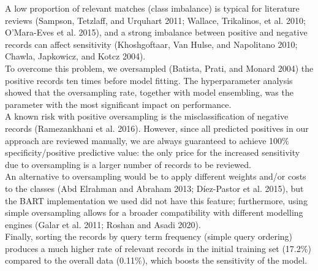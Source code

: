 \documentclass{article}
\begin{document}
A low proportion of relevant matches (class imbalance) is typical for
literature reviews (Sampson, Tetzlaff, and Urquhart 2011; Wallace,
Trikalinos, et al. 2010; O'Mara-Eves et al. 2015), and a strong
imbalance between positive and negative records can affect sensitivity
(Khoshgoftaar, Van Hulse, and Napolitano 2010; Chawla, Japkowicz, and
Kotcz 2004).\\
To overcome this problem, we oversampled (Batista, Prati, and Monard
2004) the positive records ten times before model fitting. The
hyperparameter analysis showed that the oversampling rate, together with
model ensembling, was the parameter with the most significant impact on
performance.\\
A known risk with positive oversampling is the misclassification of
negative records (Ramezankhani et al. 2016). However, since all
predicted positives in our approach are reviewed manually, we are always
guaranteed to achieve 100\% specificity/positive predictive value: the
only price for the increased sensitivity due to oversampling is a larger
number of records to be reviewed.\\
An alternative to oversampling would be to apply different weights
and/or costs to the classes (Abd Elrahman and Abraham 2013; Díez-Pastor
et al. 2015), but the BART implementation we used did not have this
feature; furthermore, using simple oversampling allows for a broader
compatibility with different modelling engines (Galar et al. 2011;
Roshan and Asadi 2020).\\
Finally, sorting the records by query term frequency (simple query
ordering) produces a much higher rate of relevant records in the initial
training set (17.2\%) compared to the overall data (0.11\%), which
boosts the sensitivity of the model.\\
\end{document}
